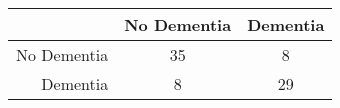 \begin{table}[ht]
\centering
\begin{tabular}{r|c|c}
  \hline
 & No Dementia & Dementia \\ 
  \hline
No Dementia & 35 & 8 \\ 
  Dementia & 8 & 29 \\ 
   \hline
\end{tabular}
\end{table}

